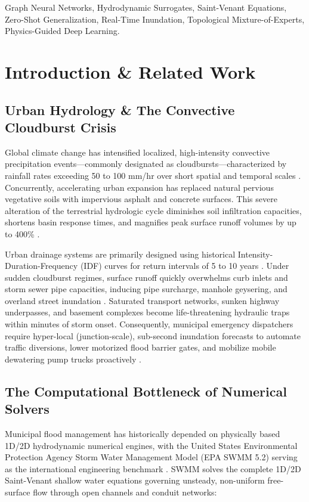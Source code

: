 \documentclass[conference]{IEEEtran}
\begin{document}
\begin{abstract}
\end{abstract}

\begin{IEEEkeywords}
Graph Neural Networks, Hydrodynamic Surrogates, Saint-Venant Equations, Zero-Shot Generalization, Real-Time Inundation, Topological Mixture-of-Experts, Physics-Guided Deep Learning.
\end{IEEEkeywords}

\section{Introduction \& Related Work}

\subsection{Urban Hydrology \& The Convective Cloudburst Crisis}
Global climate change has intensified localized, high-intensity convective precipitation events---commonly designated as cloudbursts---characterized by rainfall rates exceeding 50 to 100 mm/hr over short spatial and temporal scales \cite{mishra2018, groisman2012}. Concurrently, accelerating urban expansion has replaced natural pervious vegetative soils with impervious asphalt and concrete surfaces. This severe alteration of the terrestrial hydrologic cycle diminishes soil infiltration capacities, shortens basin response times, and magnifies peak surface runoff volumes by up to 400\% \cite{walsh2005}.

Urban drainage systems are primarily designed using historical Intensity-Duration-Frequency (IDF) curves for return intervals of 5 to 10 years \cite{chow1988}. Under sudden cloudburst regimes, surface runoff quickly overwhelms curb inlets and storm sewer pipe capacities, inducing pipe surcharge, manhole geysering, and overland street inundation \cite{arnold1998}. Saturated transport networks, sunken highway underpasses, and basement complexes become life-threatening hydraulic traps within minutes of storm onset. Consequently, municipal emergency dispatchers require hyper-local (junction-scale), sub-second inundation forecasts to automate traffic diversions, lower motorized flood barrier gates, and mobilize mobile dewatering pump trucks proactively \cite{beck1987}.

\subsection{The Computational Bottleneck of Numerical Solvers}
Municipal flood management has historically depended on physically based 1D/2D hydrodynamic numerical engines, with the United States Environmental Protection Agency Storm Water Management Model (EPA SWMM 5.2) serving as the international engineering benchmark \cite{rossman2015}. SWMM solves the complete 1D/2D Saint-Venant shallow water equations governing unsteady, non-uniform free-surface flow through open channels and conduit networks:
\end{document}
